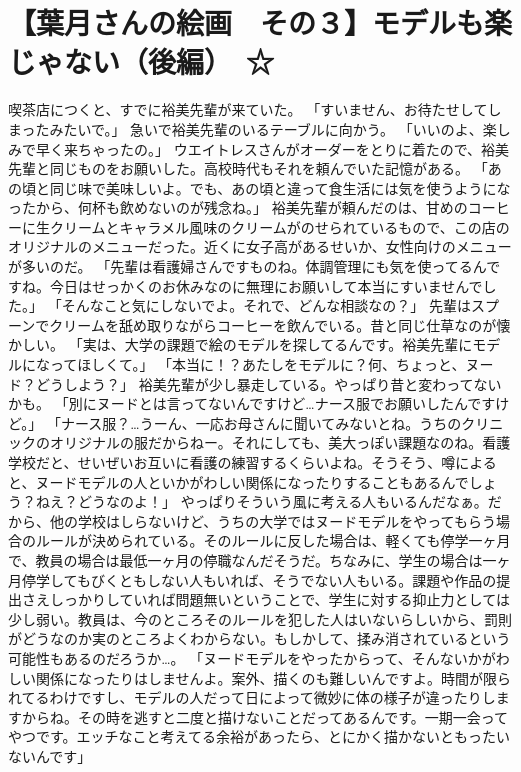 \section{【葉月さんの絵画　その３】モデルも楽じゃない（後編）　☆}

喫茶店につくと、すでに裕美先輩が来ていた。
「すいません、お待たせしてしまったみたいで。」
急いで裕美先輩のいるテーブルに向かう。
「いいのよ、楽しみで早く来ちゃったの。」
ウエイトレスさんがオーダーをとりに着たので、裕美先輩と同じものをお願いした。高校時代もそれを頼んでいた記憶がある。
「あの頃と同じ味で美味しいよ。でも、あの頃と違って食生活には気を使うようになったから、何杯も飲めないのが残念ね。」
裕美先輩が頼んだのは、甘めのコーヒーに生クリームとキャラメル風味のクリームがのせられているもので、この店のオリジナルのメニューだった。近くに女子高があるせいか、女性向けのメニューが多いのだ。
「先輩は看護婦さんですものね。体調管理にも気を使ってるんですね。今日はせっかくのお休みなのに無理にお願いして本当にすいませんでした。」
「そんなこと気にしないでよ。それで、どんな相談なの？」
先輩はスプーンでクリームを舐め取りながらコーヒーを飲んでいる。昔と同じ仕草なのが懐かしい。
「実は、大学の課題で絵のモデルを探してるんです。裕美先輩にモデルになってほしくて。」
「本当に！？あたしをモデルに？何、ちょっと、ヌード？どうしよう？」
裕美先輩が少し暴走している。やっぱり昔と変わってないかも。
「別にヌードとは言ってないんですけど…ナース服でお願いしたんですけど。」
「ナース服？…うーん、一応お母さんに聞いてみないとね。うちのクリニックのオリジナルの服だからねー。それにしても、美大っぽい課題なのね。看護学校だと、せいぜいお互いに看護の練習するくらいよね。そうそう、噂によると、ヌードモデルの人といかがわしい関係になったりすることもあるんでしょう？ねえ？どうなのよ！」
やっぱりそういう風に考える人もいるんだなぁ。だから、他の学校はしらないけど、うちの大学ではヌードモデルをやってもらう場合のルールが決められている。そのルールに反した場合は、軽くても停学一ヶ月で、教員の場合は最低一ヶ月の停職なんだそうだ。ちなみに、学生の場合は一ヶ月停学してもびくともしない人もいれば、そうでない人もいる。課題や作品の提出さえしっかりしていれば問題無いということで、学生に対する抑止力としては少し弱い。教員は、今のところそのルールを犯した人はいないらしいから、罰則がどうなのか実のところよくわからない。もしかして、揉み消されているという可能性もあるのだろうか…。
「ヌードモデルをやったからって、そんないかがわしい関係になったりはしませんよ。案外、描くのも難しいんですよ。時間が限られてるわけですし、モデルの人だって日によって微妙に体の様子が違ったりしますからね。その時を逃すと二度と描けないことだってあるんです。一期一会ってやつです。エッチなこと考えてる余裕があったら、とにかく描かないともったいないんです」
